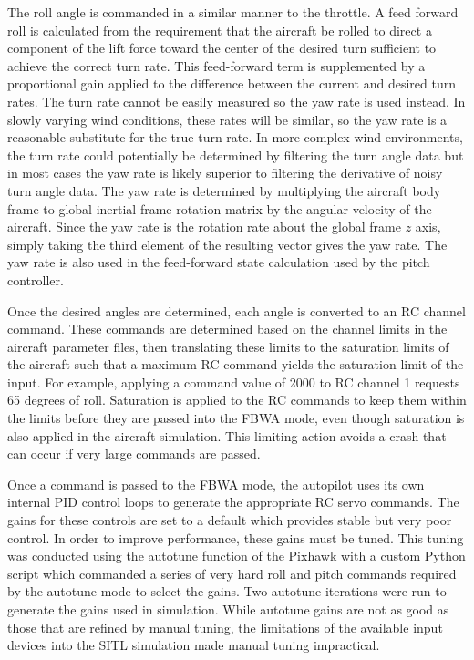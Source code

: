 \documentclass{aiaa}
\begin{document}
The roll angle is commanded in a similar manner to the throttle. A feed forward roll is calculated from the requirement that the aircraft be rolled to direct a component of the lift force toward the center of the desired turn sufficient to achieve the correct turn rate. This feed-forward term is supplemented by a proportional gain applied to the difference between the current and desired turn rates. The turn rate cannot be easily measured so the yaw rate is used instead. In slowly varying wind conditions, these rates will be similar, so the yaw rate is a reasonable substitute for the true turn rate. In more complex wind environments, the turn rate could potentially be determined by filtering the turn angle data but in most cases the yaw rate is likely superior to filtering the derivative of noisy turn angle data. The yaw rate is determined by multiplying the aircraft body frame to global inertial frame rotation matrix by the angular velocity of the aircraft. Since the yaw rate is the rotation rate about the global frame $z$ axis, simply taking the third element of the resulting vector gives the yaw rate. The yaw rate is also used in the feed-forward state calculation used by the pitch controller.

Once the desired angles are determined, each angle is converted to an RC channel command. These commands are determined based on the channel limits in the aircraft parameter files, then translating these limits to the saturation limits of the aircraft such that a maximum RC command yields the saturation limit of the input. For example, applying a command value of 2000 to RC channel 1 requests 65 degrees of roll.  Saturation is applied to the RC commands to keep them within the limits before they are passed into the FBWA mode, even though saturation is also applied in the aircraft simulation. This limiting action avoids a crash that can occur if very large commands are passed.

Once a command is passed to the FBWA mode, the autopilot uses its own internal PID control loops to generate the appropriate RC servo commands. The gains for these controls are set to a default which provides stable but very poor control. In order to improve performance, these gains must be tuned. This tuning was conducted using the autotune function of the Pixhawk with a custom Python script which commanded a series of very hard roll and pitch commands required by the autotune mode to select the gains. Two autotune iterations were run to generate the gains used in simulation. While autotune gains are not as good as those that are refined by manual tuning, the limitations of the available input devices into the SITL simulation made manual tuning impractical.
\end{document}
